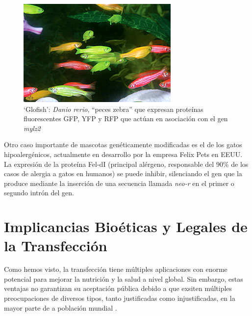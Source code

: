 \documentclass[fleqn,10pt]{SelfArx} %
\begin{document}
\begin{figure}[ht]\centering
\includegraphics[width=\linewidth]{images/danio}
\caption{`Glofish': \textit{Danio rerio}, ``peces zebra'' que expresan proteínas fluorescentes GFP, YFP y RFP que actúan en asociación con el gen \textit{mylz2} \cite{gong2003development, fox2008fda}}
\end{figure}    
    
    Otro caso importante de mascotas genéticamente modificadas es el de los gatos hipoalergénicos, actualmente en desarrollo por la empresa Felix Pets en EEUU. La expresión de la proteína Fel-dI (principal alérgeno, responsable del 90\% de los casos de alergia a gatos en humanos) se puede inhibir, silenciando el gen que la produce mediante la inserción de una secuencia llamada \textit{neo-r} en el primer o segundo intrón del gen\cite{avner2012method, butt2012hypoallergenic}. 
  
\section{Implicancias Bioéticas y Legales de la Transfección}

Como hemos visto, la transfección tiene múltiples aplicaciones con enorme potencial para mejorar la nutrición y la salud a nivel global. Sin embargo, estas ventajas no garantizan su aceptación pública debido a que exsiten múltiples preocupaciones de diversos tipos, tanto justificadas como injustificadas, en la mayor parte de a población mundial \cite{berkowitz1993food, berkowitz1994transgenic, Iredale, Cooley, Rowland, Verhoog2003294, Spink, Jefferson, Ormandy}.






\end{document}
